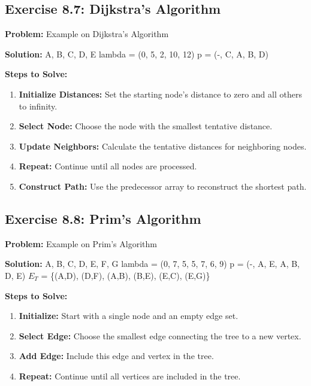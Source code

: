 \subsection{Exercise 8.7: Dijkstra's Algorithm}
\textbf{Problem:} Example on Dijkstra's Algorithm

\textbf{Solution:}
A, B, C, D, E
lambda = (0, 5, 2, 10, 12)
p = (-, C, A, B, D)

\textbf{Steps to Solve:}
\begin{enumerate}
\item \textbf{Initialize Distances:} Set the starting node's distance to zero and all others to infinity.
\item \textbf{Select Node:} Choose the node with the smallest tentative distance.
\item \textbf{Update Neighbors:} Calculate the tentative distances for neighboring nodes.
\item \textbf{Repeat:} Continue until all nodes are processed.
\item \textbf{Construct Path:} Use the predecessor array to reconstruct the shortest path.
\end{enumerate}

\subsection{Exercise 8.8: Prim's Algorithm}
\textbf{Problem:} Example on Prim's Algorithm

\textbf{Solution:}
A, B, C, D, E, F, G
lambda = (0, 7, 5, 5, 7, 6, 9)
p = (-, A, E, A, B, D, E)
$E_T$ = \{(A,D), (D,F), (A,B), (B,E), (E,C), (E,G)\}

\textbf{Steps to Solve:}
\begin{enumerate}
\item \textbf{Initialize:} Start with a single node and an empty edge set.
\item \textbf{Select Edge:} Choose the smallest edge connecting the tree to a new vertex.
\item \textbf{Add Edge:} Include this edge and vertex in the tree.
\item \textbf{Repeat:} Continue until all vertices are included in the tree.
\end{enumerate}
